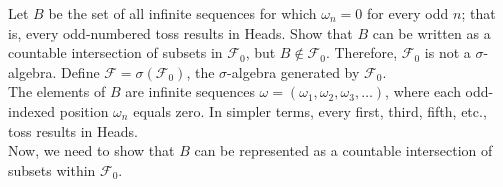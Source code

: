 \begin{exercise}
    Let \( B \) be the set of all infinite sequences for which \( \omega_n = 0 \) for every odd \( n \); that is, every odd-numbered toss results in Heads. Show that \( B \) can be written as a countable intersection of subsets in \( \mathcal{F}_0 \), but \( B \notin \mathcal{F}_0 \). Therefore, \( \mathcal{F}_0 \) is not a \( \sigma \)-algebra. Define \( \mathcal{F} = \sigma(\mathcal{F}_0) \), the \( \sigma \)-algebra generated by \( \mathcal{F}_0 \).\\

    The elements of \( B \) are infinite sequences \( \omega = (\omega_1, \omega_2, \omega_3, \ldots) \), where each odd-indexed position \( \omega_n \) equals zero. In simpler terms, every first, third, fifth, etc., toss results in Heads.\\

    Now, we need to show that \( B \) can be represented as a countable intersection of subsets within \( \mathcal{F}_0 \). 
\end{exercise}

